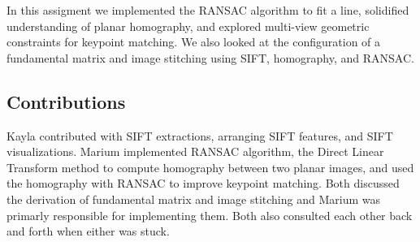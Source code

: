 In this assigment we implemented the RANSAC algorithm to fit a line, solidified understanding of planar homography, and explored multi-view geometric constraints for keypoint matching. We also looked at the configuration of a fundamental matrix and image stitching using SIFT, homography, and RANSAC.

\subsection{Contributions}
Kayla contributed with SIFT extractions, arranging SIFT features, and SIFT visualizations. Marium implemented RANSAC algorithm, the Direct Linear Transform method to compute homography between two planar images, and used the homography with RANSAC to improve keypoint matching. Both discussed the derivation of fundamental matrix and image stitching and Marium was primarly responsible for implementing them. Both also consulted each other back and forth when either was stuck. 